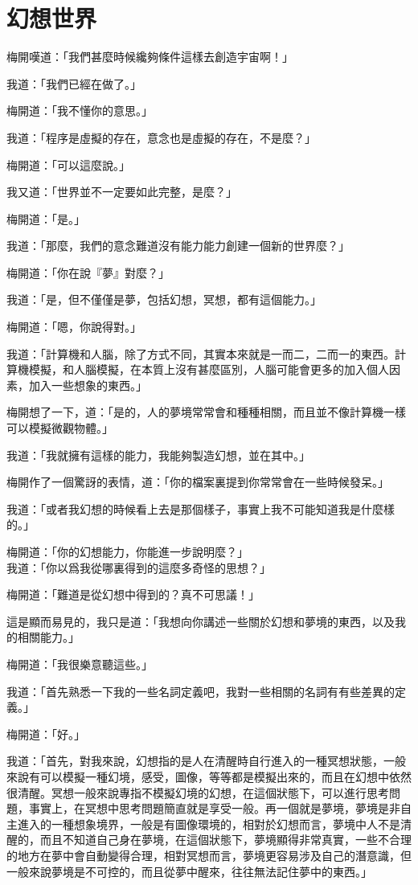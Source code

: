 \chapter{幻想世界}

梅開嘆道：「我們甚麼時候纔夠條件這樣去創造宇宙啊！」

我道：「我們已經在做了。」

梅開道：「我不懂你的意思。」

我道：「程序是虛擬的存在，意念也是虛擬的存在，不是麼？」

梅開道：「可以這麼說。」

我又道：「世界並不一定要如此完整，是麼？」

梅開道：「是。」

我道：「那麼，我們的意念難道沒有能力能力創建一個新的世界麼？」

梅開道：「你在說『夢』對麼？」

我道：「是，但不僅僅是夢，包括幻想，冥想，都有這個能力。」

梅開道：「嗯，你說得對。」

我道：「計算機和人腦，除了方式不同，其實本來就是一而二，二而一的東西。計算機模擬，和人腦模擬，在本質上沒有甚麼區別，人腦可能會更多的加入個人因素，加入一些想象的東西。」

梅開想了一下，道：「是的，人的夢境常常會和種種相關，而且並不像計算機一樣可以模擬微觀物體。」

我道：「我就擁有這樣的能力，我能夠製造幻想，並在其中。」

梅開作了一個驚訝的表情，道：「你的檔案裏提到你常常會在一些時候發呆。」

我道：「或者我幻想的時候看上去是那個樣子，事實上我不可能知道我是什麼樣的。」

梅開道：「你的幻想能力，你能進一步說明麼？」
\\


我道：「你以爲我從哪裏得到的這麼多奇怪的思想？」

梅開道：「難道是從幻想中得到的？真不可思議！」

這是顯而易見的，我只是道：「我想向你講述一些關於幻想和夢境的東西，以及我的相關能力。」

梅開道：「我很樂意聽這些。」


我道：「首先熟悉一下我的一些名詞定義吧，我對一些相關的名詞有有些差異的定義。」

梅開道：「好。」

我道：「首先，對我來說，幻想指的是人在清醒時自行進入的一種冥想狀態，一般來說有可以模擬一種幻境，感受，圖像，等等都是模擬出來的，而且在幻想中依然很清醒。冥想一般來說專指不模擬幻境的幻想，在這個狀態下，可以進行思考問題，事實上，在冥想中思考問題簡直就是享受一般。再一個就是夢境，夢境是非自主進入的一種想象境界，一般是有圖像環境的，相對於幻想而言，夢境中人不是清醒的，而且不知道自己身在夢境，在這個狀態下，夢境顯得非常真實，一些不合理的地方在夢中會自動變得合理，相對冥想而言，夢境更容易涉及自己的潛意識，但一般來說夢境是不可控的，而且從夢中醒來，往往無法記住夢中的東西。」

